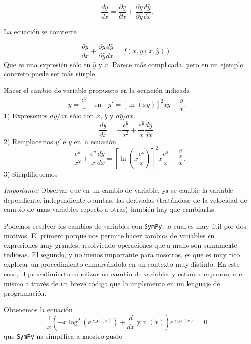 \[\frac{dy}{dx}=\frac{\partial y}{\partial x}+\frac{\partial y}{\partial \hat{y}}\frac{d\hat{y}}{dx}.\]

La ecuación se convierte

\[\frac{\partial y}{\partial x}+\frac{\partial y}{\partial \hat{y}}\frac{d\hat{y}}{dx}=f(x,y(x,\hat{y})).\]
Que es una expresión sólo en $\hat{y}$ y $x$. Parece más complicada, pero en un ejemplo concreto puede ser más simple.







\begin{ejemplo} Hacer el cambio de variable propuesto en la  ecuación indicada
\[y=\frac{e^{\hat{y}}}{x}\quad\text{en}\quad  y'=\left[\ln(xy)\right]^2xy-\frac{y}{x}.\]
 1) Expresemos $dy/dx$ sólo con $x$, $\hat{y}$ y $d\hat{y}/dx$.
\[\frac{dy}{dx}=-\frac{e^{\hat{y}}}{x^2}+\frac{e^{\hat{y}}}{x}\frac{d\hat{y}}{dx}.\]
 2) Remplacemos $y'$ e $y$ en la ecuación
\[-\frac{e^{\hat{y}}}{x^2}+\frac{e^{\hat{y}}}{x}\frac{d\hat{y}}{dx}=\left[\ln\left(x \frac{e^{\hat{y}}}{x} \right)\right]^2x\frac{e^{\hat{y}}}{x}-\frac{\frac{e^{\hat{y}}}{x} }{x}.\]
 3) Simplifiquemos




\end{ejemplo}

\advertencia \emph{Importante:} Observar  que en un cambio de variable, ya se cambie la variable dependiente, independiente o ambas, las derivadas (tratándose de la velocidad de cambio de unas variables repecto a otras)  también hay que cambiarlas.


Podemos resolver los cambios de variables con \texttt{SymPy}, lo cual es muy útil por dos motivos. El primero porque nos permite hacer cambios de variables en expresiones muy grandes, resolviendo operaciones que a mano son sumamente tediosas. El segundo, y no menos importante para nosotros, es que es muy rico explorar un procedimiento enmarcándolo en un contexto muy distinto. En este caso, el procedimiento es relizar un cambio de variables y estamos explorando el mismo a través de un breve código que lo implementa en un lenguaje de programación.


Obtenemos la ecuación
\[\frac{1}{x} \left(- x \log^{2}{\left (e^{\operatorname{y\_n}{\left (x \right )
}} \right )} + \frac{d}{d x} \operatorname{y\_n}{\left (x \right )}\right) e^{
\operatorname{y\_n}{\left (x \right )}} = 0\]
que \texttt{SymPy} no simplifica a nuestro gusto




